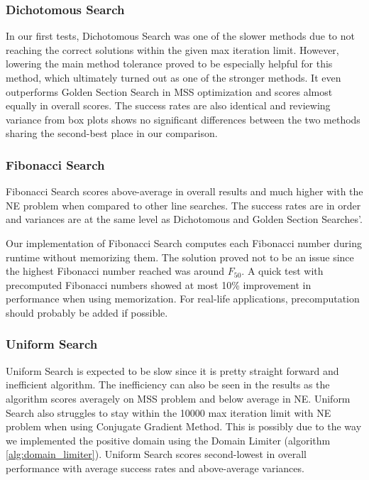 \documentclass[a4paper,english,titlepage,12pt]{article}
\begin{document}
\subsubsection*{Dichotomous Search}

In our first tests, Dichotomous Search was one of the slower methods due to not reaching the correct solutions within the given max iteration limit. However, lowering the main method tolerance proved to be especially helpful for this method, which ultimately turned out as one of the stronger methods. It even outperforms Golden Section Search in MSS optimization and scores almost equally in overall scores. The success rates are also identical and reviewing variance from box plots shows no significant differences between the two methods sharing the second-best place in our comparison.

\subsubsection*{Fibonacci Search}

Fibonacci Search scores above-average in overall results and much higher with the NE problem when compared to other line searches. The success rates are in order and variances are at the same level as Dichotomous and Golden Section Searches'.

Our implementation of Fibonacci Search computes each Fibonacci number during runtime without memorizing them. The solution proved not to be an issue since the highest Fibonacci number reached was around $F_{50}$. A quick test with precomputed Fibonacci numbers showed at most 10\% improvement in performance when using memorization. For real-life applications, precomputation should probably be added if possible.

\subsubsection*{Uniform Search}

Uniform Search is expected to be slow since it is pretty straight forward and inefficient algorithm. The inefficiency can also be seen in the results as the algorithm scores averagely on MSS problem and below average in NE. Uniform Search also struggles to stay within the 10000 max iteration limit with NE problem when using Conjugate Gradient Method. This is possibly due to the way we implemented the positive domain using the Domain Limiter (algorithm \ref{alg:domain_limiter}). Uniform Search scores second-lowest in overall performance with average success rates and above-average variances.
\end{document}
